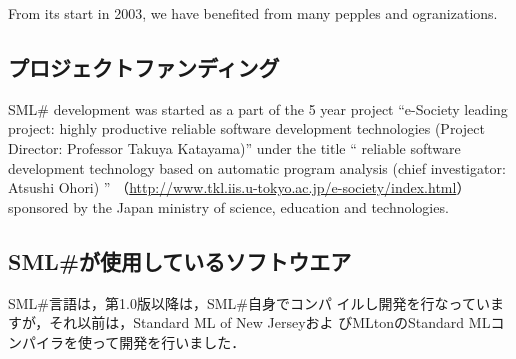 \documentclass{jbook}
\newif\ifjp
\newcommand{\txt}[2]{#1}
\newcommand{\smlsharp}{SML\#}
\newcommand{\smlsharpSize}{\txt{30万}{0.3 millions}}
\begin{document}
\ifjp%
	2003年にスタートした\smlsharp{}開発の過程では，以下を含む色々な
ご指導やご協力を頂きました．
	ここに謝意を表します．
\else%
	From its start in 2003, we have benefited from many pepples and
ogranizations.
\fi%
	
\subsection{\txt{プロジェクトファンディング}{Project funding}}

\ifjp%
	\smlsharp{}言語の研究開発は，2003年から5年間の文部科学省リーディ
ングプロジェクトe-Society基盤ソフトウェアの総合開発「高い生産性をもつ高
信頼ソフトウェア作成技術の開発」
（\url{http://www.tkl.iis.u-tokyo.ac.jp/e-society/index.html）}
の一つの課題
「プログラムの自動解析に基づく高信頼ソフトウェアシステム構築技術」（究代
表者:大堀 淳）としてスタートをきることができました．
	このプロジェクトの主要な目標が\smlsharp{}言語コンパイラの開発で
した．
	\smlsharp{}は開発ソースの総量が\smlsharpSize{}行を超える大規模シ
ステムです．
	このプロジェクトの支援がなければ，\smlsharp{}の開発は困難であっ
たと思われます．
	文部科学省，e-Societyの領域代表の片山卓也先生，および関係各位に
深謝いたします．
\else%
	\smlsharp{} development was started as a part of the 5 year
project 
``e-Society leading project: highly productive reliable software
development technologies (Project Director: Professor Takuya Katayama)'' 
under the title
``
reliable software development technology based on automatic program analysis
(chief investigator: Atsushi Ohori)
''
（\url{http://www.tkl.iis.u-tokyo.ac.jp/e-society/index.html}）
sponsored by the Japan ministry of science, education and technologies.
\fi%

\subsection{
\txt{\smlsharp{}が使用しているソフトウエア}
    {Third-party code and software tool used in \smlsharp{} development}
}

\ifjp%
	\smlsharp{}言語は，第1.0版以降は，\smlsharp{}自身でコンパ
イルし開発を行なっていますが，それ以前は，Standard ML of New Jerseyおよ
びMLtonのStandard MLコンパイラを使って開発を行いました．
\end{document}
